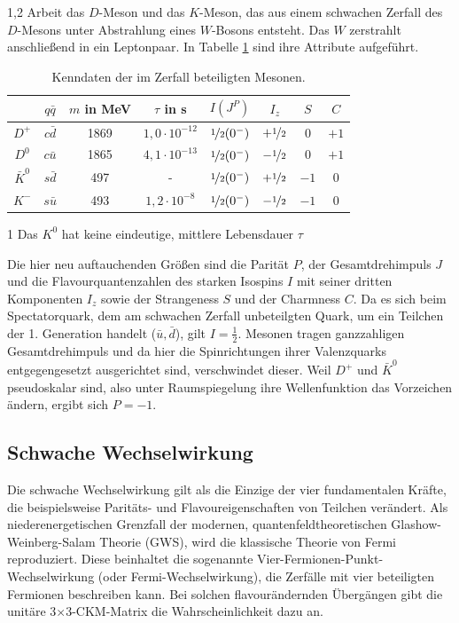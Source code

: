 \documentclass[11pt,a4paper,twoside]{report}
\begin{document}
\begin{spacing}{1,2}
Arbeit das $D$-Meson und das $K$-Meson, das aus einem schwachen Zerfall des $D$-Mesons unter Abstrahlung eines $W$-Bosons entsteht. Das $W$ zerstrahlt 
anschließend in ein Leptonpaar. In Tabelle \ref{tab_DKMeson} sind ihre Attribute \cite{PDG} aufgeführt.
\begin{table}[H]
\begin{threeparttable}[H]
\begin{tabular}{c|ccc|cccc} \toprule 
  & $q\bar q$ &  $m$ in MeV & $\tau$ in s & $I(J^P)$ & $I_z$ & $S$ & $C$\\
 \midrule
  $D^+$ & $c\bar d$ & 1869 & $1,0\cdot10^{-12}$ & $\nicefrac12(0^-)$ & $+\nicefrac12$ & 0 & $+1$\\
  $D^0$ & $c\bar u$ & 1865 & $4,1\cdot10^{-13}$  & $\nicefrac12(0^-)$ & $-\nicefrac12$ & 0 & $+1$\\
  $\bar K^0$ & $s\bar d$ & 497 & -\tnote{1} & $\nicefrac12(0^-)$ & $+\nicefrac12$ & $-1$& 0\\
  $K^-$ & $s\bar u $ & 493 & $1,2\cdot10^{-8}$ & $\nicefrac12(0^-)$ & $-\nicefrac12$ & $-1$ & 0
\\\bottomrule \bottomrule
 \end{tabular}
 \begin{tablenotes}
 \item[1] \small{Das $K^0$ hat keine eindeutige, mittlere Lebensdauer $\tau$}
  \end{tablenotes}
\caption{Kenndaten der im Zerfall beteiligten Mesonen.}
\label{tab_DKMeson}
\end{threeparttable}
\end{table}
\noindent
Die hier neu auftauchenden Größen sind die Parität $P$, der Gesamtdrehimpuls $J$ und die Flavourquantenzahlen des starken Isospins $I$ mit 
seiner dritten Komponenten $I_z$ sowie der Strangeness $S$ und der Charmness $C$. Da es sich beim Spectatorquark, dem am schwachen Zerfall unbeteilgten 
Quark, um ein Teilchen der 1. Generation 
handelt ($\bar u, \bar d$), gilt $I = \frac12$.  Mesonen tragen ganzzahligen Gesamtdrehimpuls und da hier die Spinrichtungen ihrer Valenzquarks 
entgegengesetzt ausgerichtet sind, verschwindet dieser. Weil $D^+$ und $\bar K^0$ pseudoskalar sind, also unter Raumspiegelung ihre Wellenfunktion das 
Vorzeichen ändern, ergibt sich $P=-1$.

\subsection{Schwache Wechselwirkung}
\label{sec_schwacheWW}
Die schwache Wechselwirkung gilt als die Einzige der vier fundamentalen Kräfte, die beispielsweise Paritäts- und Flavoureigenschaften von Teilchen verändert.
Als niederenergetischen Grenzfall der modernen, quantenfeldtheoretischen Glashow-Weinberg-Salam Theorie (GWS), wird die klassische Theorie von Fermi 
reproduziert. Diese beinhaltet die
sogenannte Vier-Fermionen-Punkt-Wechselwirkung (oder Fermi-Wechselwirkung), die Zerfälle mit vier beteiligten Fermionen beschreiben kann. Bei solchen
flavourändernden Übergängen gibt die unitäre 3$\times$3-CKM-Matrix die Wahrscheinlichkeit dazu an. 


\end{spacing}
\end{document}
